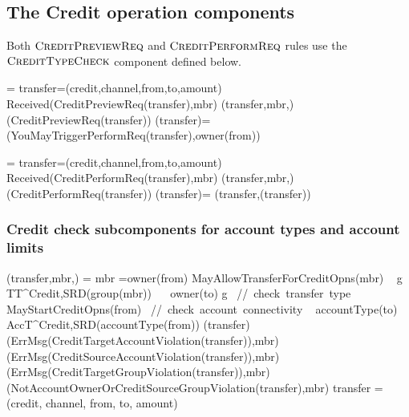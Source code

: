  \subsection{The Credit operation components}
 
 Both $\hbox{\sc CreditPreviewReq}$ and $ \hbox{\sc CreditPerformReq}$ rules use the $ \hbox{\sc CreditTypeCheck}$ component defined below.
 
 \begin{asm}
  =\+
    \LET transfer=(credit,channel,from,to,amount)\+
        \IF Received(CreditPreviewReq(transfer),\FROM mbr) \THEN \+   
           (transfer,mbr,)\\
            (CreditPreviewReq(transfer)) \dec\dec\-
      \WHERE \+
         (transfer)=\+
        (YouMayTriggerPerformReq(transfer),\TO owner(from))
 \end{asm}
 
 
 \begin{asm}
  =\+
 \LET transfer=(credit,channel,from,to,amount)\\
 \IF Received(CreditPerformReq(transfer),\FROM mbr) \THEN \+  
 (transfer,mbr,)\\
 (CreditPerformReq(transfer))\dec\-
 \WHERE \+
 (transfer)=\+
 (transfer,(transfer))
 \end{asm}
 
 \subsubsection{Credit check subcomponents for account types and account limits} 
 
 \begin{asm}
 	(transfer,mbr,)  =\+
 	\IF mbr =owner(from) \AND MayAllowTransferForCreditOpns(mbr) \THEN \+
 	\IF ~ \FORSOME g \in TT^{Credit,SRD}(group(mbr)) 
 	~~ owner(to) \in g   \mbox{  // check transfer type} \THEN \+
 	\IF MayStartCreditOpns(from) 
 	\mbox{  // check account connectivity} \THEN \+
 	\IF ~ accountType(to) \in 
 	AccT^{Credit,SRD}(accountType(from)) \THEN \+
 	(transfer) \-
 	\ELSE ~ (ErrMsg(CreditTargetAccountViolation(transfer)),\TO mbr) \-
 	\ELSE ~ (ErrMsg(CreditSourceAccountViolation(transfer)),\TO mbr)\-
 	\ELSE ~ (ErrMsg(CreditTargetGroupViolation(transfer)),\TO mbr) \- 
 	\ELSE ~  (NotAccountOwnerOrCreditSourceGroupViolation(transfer),\TO mbr)\-
 	\WHERE \+
 	transfer = (credit, channel, from, to, amount)   
 \end{asm}
 
